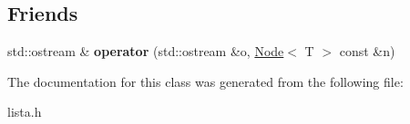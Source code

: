 \subsection*{Friends}
\begin{DoxyCompactItemize}
\item 
std\+::ostream \& {\bfseries operator} (std\+::ostream \&o, \hyperlink{classNode}{Node}$<$ T $>$ const \&n)\hypertarget{classNode_af4dd23ddeacb247749f1f4fc7e22d96f}{}\label{classNode_af4dd23ddeacb247749f1f4fc7e22d96f}

\end{DoxyCompactItemize}


The documentation for this class was generated from the following file\+:\begin{DoxyCompactItemize}
\item 
lista.\+h\end{DoxyCompactItemize}
